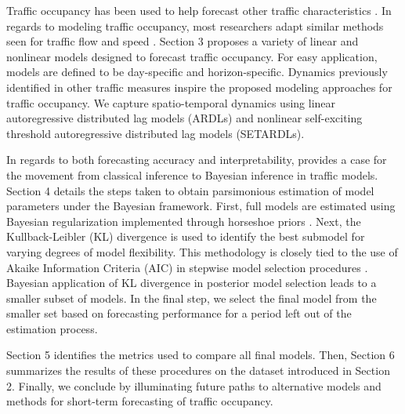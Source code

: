 Traffic occupancy has been used to help forecast other traffic characteristics \citep{Hazelton2004}.  In regards to modeling traffic occupancy, most researchers adapt similar methods seen for traffic flow and speed \citep{Kamarianakis2010}. Section 3 proposes a variety of linear and nonlinear models designed to forecast traffic occupancy. For easy application, models are defined to be day-specific and horizon-specific. Dynamics previously identified in other traffic measures inspire the proposed modeling approaches for traffic occupancy.  We capture spatio-temporal dynamics using linear autoregressive distributed lag models (ARDLs) and nonlinear self-exciting threshold autoregressive distributed lag models (SETARDLs).

In regards to both forecasting accuracy and interpretability, \cite{Ghosh2007} provides a case for the movement from classical inference to Bayesian inference in traffic models. Section 4 details the steps taken to obtain parsimonious estimation of model parameters under the Bayesian framework. First, full models are estimated using Bayesian regularization implemented through horseshoe priors \citep{Carvalho2009,Carvalho2010}. Next, the Kullback-Leibler (KL) divergence  \citep{Kullback1951} is used to identify the best submodel for varying degrees of model flexibility. This methodology is closely tied to the use of Akaike Information Criteria (AIC) in stepwise model selection procedures \citep{Akaike1998}. Bayesian application of KL divergence in posterior model selection leads to a smaller subset of models. In the final step, we select the final model from the smaller set based on forecasting performance for a period left out of the estimation process.

Section 5  identifies the metrics used to compare all final models. Then, Section 6 summarizes the results of these procedures on the dataset introduced in Section 2. Finally, we conclude by illuminating future paths to alternative models and methods for short-term forecasting of traffic occupancy.







